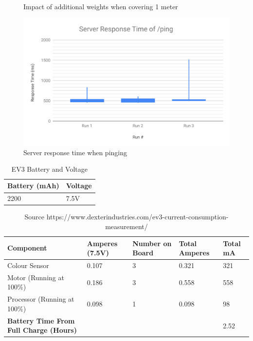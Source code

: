 \documentclass[a4paper]{article}
\begin{document}
\begin{center}
\begin{figure}[!htb]
      \caption{Impact of additional weights when covering 1 meter}\label{fig:awesome_image3}
\endminipage
{}
      \includegraphics[width=\textwidth]{time_ping.pdf}
      \caption{Server response time when pinging}\label{fig:awesome_image4}
\endminipage
\newline
\end{figure}
\begin{table}[!htb]
\centering
\begin{tabular}{| p{2cm} | p{2cm} |}
\hline
\textbf{Battery (mAh)} & \textbf{Voltage} \\
\hline
2200 & 7.5V \\
\hline
\end{tabular}
\caption{EV3 Battery and Voltage}
\end{table}
\begin{table}[!htb]
\centering
\begin{tabular}{| p{2.2cm} | p{2cm} | p{2.2cm} | p{2cm} | p{2cm} |}
\hline
\textbf{Component} & \textbf{Amperes (7.5V)} & \textbf{Number on Board} & \textbf{Total Amperes} & \textbf{Total mA}\\
\hline
Colour Sensor & 0.107 & 3 & 0.321 & 321 \\
\hline
Motor (Running at 100\%) & 0.186 & 3 & 0.558 & 558 \\
\hline 
Processor (Running at 100\%) & 0.098 & 1 & 0.098 & 98 \\
\hline
\textbf{Battery Time From Full Charge (Hours)} & & & & 2.52 \\ 
 \hline
\end{tabular}
\caption{Source https://www.dexterindustries.com/ev3-current-consumption-measurement/}
\end{table}
\end{center}
  
\end{document}
